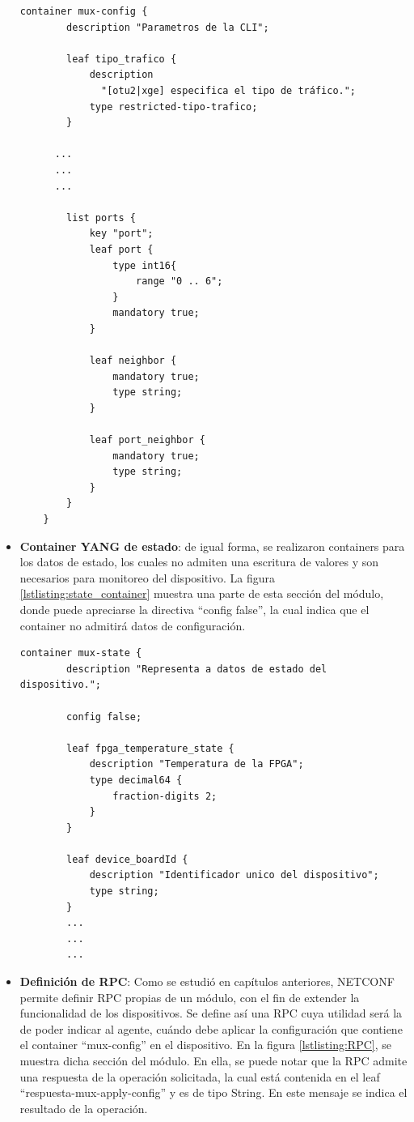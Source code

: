 \begin{itemize}
    \begin{lstlisting}[language=SHELXL, caption=Container de configuración., label=lstlisting:config_container]
    container mux-config {
        description "Parametros de la CLI";

        leaf tipo_trafico {
            description
              "[otu2|xge] especifica el tipo de tráfico.";
            type restricted-tipo-trafico;
        }
      
      ...
      ...
      ...
        
        list ports {
            key "port";
            leaf port {
                type int16{
                    range "0 .. 6";
                }
                mandatory true;
            }

            leaf neighbor {
                mandatory true;
                type string;
            }
            
            leaf port_neighbor {
                mandatory true;
                type string;
            }
        }
    }
    \end{lstlisting}

    \item \textbf{Container YANG de estado}: de igual forma, se realizaron containers para los datos de estado, los cuales no admiten una escritura de valores y son necesarios para monitoreo del dispositivo. La figura \ref{lstlisting:state_container} muestra una parte de esta sección del módulo, donde puede apreciarse la directiva “config false”, la cual indica que el container no admitirá datos de configuración.  
    
    \newpage

    \begin{lstlisting}[language=SHELXL, caption=Container de estado., label=lstlisting:state_container]
    container mux-state {
        description "Representa a datos de estado del dispositivo.";
        
        config false;

        leaf fpga_temperature_state {
            description "Temperatura de la FPGA";
            type decimal64 {
                fraction-digits 2;
            }
        }
   
        leaf device_boardId {
            description "Identificador unico del dispositivo";
            type string;
        }
        ...
        ...
        ...
    \end{lstlisting}


    \item \textbf{Definición de RPC}: Como se estudió en capítulos anteriores, NETCONF permite definir RPC propias de un módulo, con el fin de extender la funcionalidad de los dispositivos. Se define así una RPC cuya utilidad será la de poder indicar al agente, cuándo debe aplicar la configuración que contiene el container “mux-config” en el dispositivo. En la figura \ref{lstlisting:RPC}, se muestra dicha sección del módulo. En ella, se puede notar que la RPC admite una respuesta de la operación solicitada, la cual está contenida en el leaf “respuesta-mux-apply-config” y es de tipo String. En este mensaje se indica el resultado de la operación.



\end{itemize}
